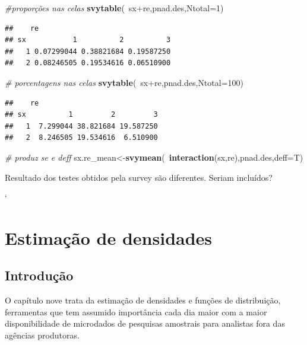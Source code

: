 \documentclass[]{book}
\newenvironment{Shaded}{\begin{snugshade}}{\end{snugshade}}
\newcommand{\KeywordTok}[1]{\textcolor[rgb]{0.13,0.29,0.53}{\textbf{{#1}}}}
\newcommand{\DataTypeTok}[1]{\textcolor[rgb]{0.13,0.29,0.53}{{#1}}}
\newcommand{\DecValTok}[1]{\textcolor[rgb]{0.00,0.00,0.81}{{#1}}}
\newcommand{\CommentTok}[1]{\textcolor[rgb]{0.56,0.35,0.01}{\textit{{#1}}}}
\newcommand{\NormalTok}[1]{{#1}}
\numberwithin{example}{chapter}
\numberwithin{remark}{chapter}
\numberwithin{definition}{chapter}
\begin{document}
\begin{Shaded}
\begin{Highlighting}[]
\CommentTok{#proporções nas celas}
\KeywordTok{svytable}\NormalTok{(~sx+re,pnad.des,}\DataTypeTok{Ntotal=}\DecValTok{1}\NormalTok{)}
\end{Highlighting}
\end{Shaded}

\begin{verbatim}
##    re
## sx           1          2          3
##   1 0.07299044 0.38821684 0.19587250
##   2 0.08246505 0.19534616 0.06510900
\end{verbatim}

\begin{Shaded}
\begin{Highlighting}[]
\CommentTok{# porcentagens nas celas}
\KeywordTok{svytable}\NormalTok{(~sx+re,pnad.des,}\DataTypeTok{Ntotal=}\DecValTok{100}\NormalTok{)}
\end{Highlighting}
\end{Shaded}

\begin{verbatim}
##    re
## sx          1         2         3
##   1  7.299044 38.821684 19.587250
##   2  8.246505 19.534616  6.510900
\end{verbatim}

\begin{Shaded}
\begin{Highlighting}[]
\CommentTok{# produz se e deff}
\NormalTok{sx.re_mean<-}\KeywordTok{svymean}\NormalTok{(~}\KeywordTok{interaction}\NormalTok{(sx,re),pnad.des,}\DataTypeTok{deff=}\NormalTok{T)}
\end{Highlighting}
\end{Shaded}

Resultado dos testes obtidos pela survey são diferentes. Seriam
incluídos?

`

\chapter{Estimação de densidades}\label{estimacao-de-densidades}

\section{Introdução}\label{introducao-3}

O capítulo nove trata da estimação de densidades e funções de
distribuição, ferramentas que tem assumido importância cada dia maior
com a maior disponibilidade de microdados de pesquisas amostrais para
analistas fora das agências produtoras.
\end{document}
